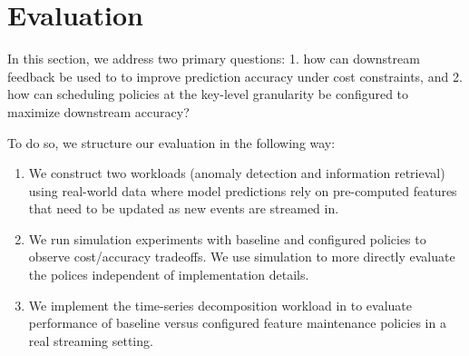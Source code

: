 \section{Evaluation}
\label{s:evaluation}
In this section, we address two primary questions: 1. how can downstream feedback be used to to improve prediction accuracy under cost constraints, and 2. how can scheduling policies at the key-level granularity be configured to maximize downstream accuracy? 

To do so, we structure our evaluation in the following way: 
\begin{enumerate}
    \item We construct two workloads (anomaly detection and information retrieval) using real-world data where model predictions rely on pre-computed features that need to be updated as new events are streamed in. 
    \item We run simulation experiments with baseline and configured policies to observe cost/accuracy tradeoffs. 
    We use simulation to more directly evaluate the polices independent of implementation details.
    \item We implement the time-series decomposition workload in \system{} to evaluate performance of baseline versus configured feature maintenance policies in a real streaming setting. 
\end{enumerate}



 
